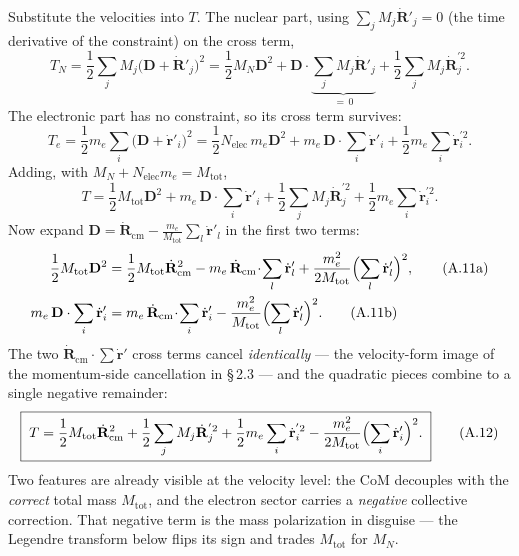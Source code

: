 Substitute the velocities into $T$. The nuclear part, using $\sum_j M_j\dot{\mathbf R}'_j = 0$ (the time derivative of the constraint) on the cross term,
\begin{equation}
T_N = \frac12\sum_j M_j\bigl(\mathbf D + \dot{\mathbf R}'_j\bigr)^2
= \frac12 M_N \mathbf D^2 + \mathbf D\cdot\underbrace{\sum_j M_j\dot{\mathbf R}'_j}_{=\,0} + \frac12\sum_j M_j\dot{\mathbf R}_j^{'2} . \tag{A.8}
\end{equation}
The electronic part has no constraint, so its cross term survives:
\begin{equation}
T_e = \frac12 m_e\sum_i\bigl(\mathbf D + \dot{\mathbf r}'_i\bigr)^2
= \frac12 N_{\mathrm{elec}}\,m_e \mathbf D^2 + m_e\,\mathbf D\cdot\sum_i\dot{\mathbf r}'_i + \frac12 m_e\sum_i\dot{\mathbf r}_i^{'2} . \tag{A.9}
\end{equation}
Adding, with $M_N + N_{\mathrm{elec}}m_e = M_{\mathrm{tot}}$,
\begin{equation}
T = \frac12 M_{\mathrm{tot}}\mathbf D^2 + m_e\,\mathbf D\cdot\sum_i\dot{\mathbf r}'_i + \frac12\sum_j M_j\dot{\mathbf R}_j^{'2} + \frac12 m_e\sum_i\dot{\mathbf r}_i^{'2} . \tag{A.10}
\end{equation}
Now expand $\mathbf D = \dot{\mathbf R}_{\mathrm{cm}} - \frac{m_e}{M_{\mathrm{tot}}}\sum_l\dot{\mathbf r}'_l$ in the first two terms:
\begin{align}
\frac12 M_{\mathrm{tot}}\mathbf D^2
&= \frac12 M_{\mathrm{tot}}\dot{\mathbf R}_{\mathrm{cm}}^2
- m_e\,\dot{\mathbf R}_{\mathrm{cm}}\!\cdot\!\sum_l\dot{\mathbf r}'_l
+ \frac{m_e^2}{2M_{\mathrm{tot}}}\Bigl(\sum_l\dot{\mathbf r}'_l\Bigr)^2 , \tag{A.11a}
\\
m_e\,\mathbf D\cdot\sum_i\dot{\mathbf r}'_i
&= m_e\,\dot{\mathbf R}_{\mathrm{cm}}\!\cdot\!\sum_i\dot{\mathbf r}'_i
- \frac{m_e^2}{M_{\mathrm{tot}}}\Bigl(\sum_l\dot{\mathbf r}'_l\Bigr)^2 . \tag{A.11b}
\end{align}
The two $\dot{\mathbf R}_{\mathrm{cm}}\!\cdot\!\sum\dot{\mathbf r}'$ cross terms cancel \emph{identically} --- the velocity-form image of the momentum-side cancellation in \S\,2.3 --- and the quadratic pieces combine to a single negative remainder:
\begin{equation}
\boxed{\;
T = \frac12 M_{\mathrm{tot}}\dot{\mathbf R}_{\mathrm{cm}}^2
+ \frac12\sum_j M_j\dot{\mathbf R}_j^{'2}
+ \frac12 m_e\sum_i\dot{\mathbf r}_i^{'2}
- \frac{m_e^2}{2M_{\mathrm{tot}}}\Bigl(\sum_i\dot{\mathbf r}'_i\Bigr)^2 .
\;} \tag{A.12}
\end{equation}
Two features are already visible at the velocity level: the CoM decouples with the \emph{correct} total mass $M_{\mathrm{tot}}$, and the electron sector carries a \emph{negative} collective correction. That negative term is the mass polarization in disguise --- the Legendre transform below flips its sign and trades $M_{\mathrm{tot}}$ for $M_N$.

